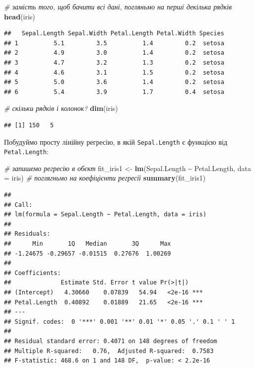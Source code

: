 \documentclass[
  11pt,
]{book}
\newenvironment{Shaded}{\begin{snugshade}}{\end{snugshade}}
\newcommand{\AttributeTok}[1]{\textcolor[rgb]{0.13,0.29,0.53}{#1}}
\newcommand{\CommentTok}[1]{\textcolor[rgb]{0.56,0.35,0.01}{\textit{#1}}}
\newcommand{\FunctionTok}[1]{\textcolor[rgb]{0.13,0.29,0.53}{\textbf{#1}}}
\newcommand{\NormalTok}[1]{#1}
\newcommand{\OtherTok}[1]{\textcolor[rgb]{0.56,0.35,0.01}{#1}}
\newcommand{\SpecialCharTok}[1]{\textcolor[rgb]{0.81,0.36,0.00}{\textbf{#1}}}
\begin{document}
\begin{Shaded}
\begin{Highlighting}[]
\CommentTok{\# замість того, щоб бачити всі дані, погляньмо на перші декілька рядків}
\FunctionTok{head}\NormalTok{(iris)}
\end{Highlighting}
\end{Shaded}

\begin{verbatim}
##   Sepal.Length Sepal.Width Petal.Length Petal.Width Species
## 1          5.1         3.5          1.4         0.2  setosa
## 2          4.9         3.0          1.4         0.2  setosa
## 3          4.7         3.2          1.3         0.2  setosa
## 4          4.6         3.1          1.5         0.2  setosa
## 5          5.0         3.6          1.4         0.2  setosa
## 6          5.4         3.9          1.7         0.4  setosa
\end{verbatim}

\begin{Shaded}
\begin{Highlighting}[]
\CommentTok{\# скільки рядків і колонок?}
\FunctionTok{dim}\NormalTok{(iris)}
\end{Highlighting}
\end{Shaded}

\begin{verbatim}
## [1] 150   5
\end{verbatim}

Побудуймо просту лінійну регресію, в якій \texttt{Sepal.Length} є функцією від \texttt{Petal.Length}:

\begin{Shaded}
\begin{Highlighting}[]
\CommentTok{\# запишемо регресію в об\textquotesingle{}єкт}
\NormalTok{fit\_iris1 }\OtherTok{\textless{}{-}} \FunctionTok{lm}\NormalTok{(Sepal.Length }\SpecialCharTok{\textasciitilde{}}\NormalTok{ Petal.Length, }\AttributeTok{data =}\NormalTok{ iris)}
\CommentTok{\# поглягньмо на коефіцієнти регресії}
\FunctionTok{summary}\NormalTok{(fit\_iris1)}
\end{Highlighting}
\end{Shaded}

\begin{verbatim}
## 
## Call:
## lm(formula = Sepal.Length ~ Petal.Length, data = iris)
## 
## Residuals:
##      Min       1Q   Median       3Q      Max 
## -1.24675 -0.29657 -0.01515  0.27676  1.00269 
## 
## Coefficients:
##              Estimate Std. Error t value Pr(>|t|)    
## (Intercept)   4.30660    0.07839   54.94   <2e-16 ***
## Petal.Length  0.40892    0.01889   21.65   <2e-16 ***
## ---
## Signif. codes:  0 '***' 0.001 '**' 0.01 '*' 0.05 '.' 0.1 ' ' 1
## 
## Residual standard error: 0.4071 on 148 degrees of freedom
## Multiple R-squared:   0.76,  Adjusted R-squared:  0.7583 
## F-statistic: 468.6 on 1 and 148 DF,  p-value: < 2.2e-16
\end{verbatim}
\end{document}
